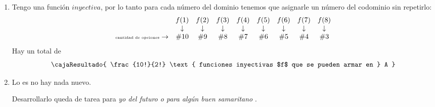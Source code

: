 \begin{enumerate}[label=\alph*)]
	\item Tengo una función $inyectiva$, por lo tanto para cada número del dominio tenemos que asignarle un número del codominio sin repetirlo:
	      $$
		      \begin{array}{lcccccccc}
			                                             & f(1)       & f(2)       & f(3)       & f(4)       & f(5)       & f(6)       & f(7)       & f(8)       \\
			                                             & \downarrow & \downarrow & \downarrow & \downarrow & \downarrow & \downarrow & \downarrow & \downarrow \\
			      {\tiny\text{cantidad de opciones}} \to & \#10       & \#9        & \#8        & \#7        & \#6        & \#5        & \#4        & \#3        \\
		      \end{array}
	      $$
	      Hay un total de
	      $$
		      \cajaResultado{
			      \frac{10!}{2!} \text{ funciones inyectivas $f$ que se pueden armar en } A
		      }
	      $$

	\item Lo es no hay nada nuevo.

	      Desarrollarlo queda de tarea para \textit{yo del futuro o para algún buen samaritano \grimace}.

	      \hacer


\end{enumerate}
